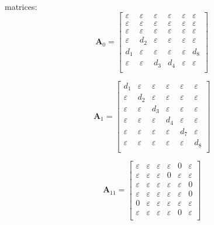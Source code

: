\documentclass[11pt, a4paper, fleqn]{article}
\begin{document}
\\
matrices:
\begin{equation*}
\mathbf{A}_{0} = 
\left[\begin{array}{ cccccc }
\varepsilon	&\varepsilon	&\varepsilon	&\varepsilon	&\varepsilon	&\varepsilon\\
\varepsilon	&\varepsilon	&\varepsilon	&\varepsilon	&\varepsilon	&\varepsilon\\
\varepsilon	&\varepsilon	&\varepsilon	&\varepsilon	&\varepsilon	&\varepsilon\\
\varepsilon	&d_2	&\varepsilon	&\varepsilon	&\varepsilon	&\varepsilon\\
d_1	&\varepsilon	&\varepsilon	&\varepsilon	&\varepsilon	&d_8\\
\varepsilon	&\varepsilon	&d_3	&d_4	&\varepsilon	&\varepsilon\\
\end{array}\right]
\end{equation*}

\begin{equation*}
\mathbf{A}_{1} = 
\left[\begin{array}{ cccccc }
d_1	&\varepsilon	&\varepsilon	&\varepsilon	&\varepsilon	&\varepsilon\\
\varepsilon	&d_2	&\varepsilon	&\varepsilon	&\varepsilon	&\varepsilon\\
\varepsilon	&\varepsilon	&d_3	&\varepsilon	&\varepsilon	&\varepsilon\\
\varepsilon	&\varepsilon	&\varepsilon	&d_4	&\varepsilon	&\varepsilon\\
\varepsilon	&\varepsilon	&\varepsilon	&\varepsilon	&d_7	&\varepsilon\\
\varepsilon	&\varepsilon	&\varepsilon	&\varepsilon	&\varepsilon	&d_8\\
\end{array}\right]
\end{equation*}

\begin{equation*}
\mathbf{A}_{11} = 
\left[\begin{array}{ cccccc }
\varepsilon	&\varepsilon	&\varepsilon	&\varepsilon	&0	&\varepsilon\\
\varepsilon	&\varepsilon	&\varepsilon	&0	&\varepsilon	&\varepsilon\\
\varepsilon	&\varepsilon	&\varepsilon	&\varepsilon	&\varepsilon	&0\\
\varepsilon	&\varepsilon	&\varepsilon	&\varepsilon	&\varepsilon	&0\\
0	&\varepsilon	&\varepsilon	&\varepsilon	&\varepsilon	&\varepsilon\\
\varepsilon	&\varepsilon	&\varepsilon	&\varepsilon	&0	&\varepsilon\\
\end{array}\right]
\end{equation*}
\end{document}
